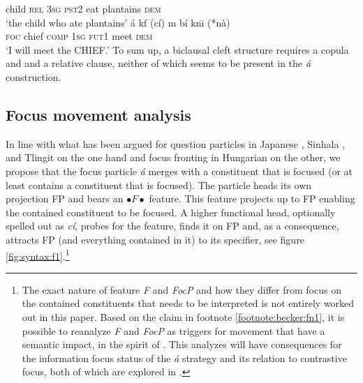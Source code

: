 \documentclass[output=paper,
modfonts
]{langscibook}
\begin{document}
     child \textsc{rel} \textsc{3sg} \textsc{pst2} eat plantains \textsc{dem} \\ 
\glt `the child who ate plantains'
\z
\ea \label{ex:becker:s6}
\gll \'{a} {kf} (c\'{i}) m b\'{i} kn\={\i} (*{n\`a}) \\  
     \textsc{foc} {chief} \textsc{comp} \textsc{1sg} \textsc{fut1} meet \textsc{dem} \\ 
\glt `I will meet the CHIEF.'
\z
To sum up, a biclausal cleft structure requires a copula and and a relative clause, neither of which seems to be present in the {\em \'a} construction.

\subsection{Focus movement analysis} \label{sec:becker:subsec:analysis}
In line with what has been argued for question particles in Japanese \citep{Hagstrom1998}, Sinhala \citep{Kishimoto2005}, and Tlingit \citep{Cable2010} on the one hand and focus fronting in Hungarian \citep{Horvath2007,Horvath2010,Horvath2013} on the other, we propose that the focus particle {\em \'a} merges with a constituent that is focused (or at least contains a constituent that is focused). The particle heads its own projection FP and bears an {\small $\bullet F \bullet$} feature. This feature projects up to FP enabling the contained constituent to be focused. A higher functional head, optionally spelled out as {\em c\'i}, probes for the feature, finds it on FP and, as a consequence, attracts FP (and everything contained in it) to its specifier, see figure \ref{fig:syntax:f1}.\footnote{The exact nature of feature {\em F} and {\em FocP} and how they differ from focus on the contained constituents that needs to be interpreted is not entirely worked out in this paper. Based on the claim in footnote \ref{footnote:becker:fn1}, it is possible to reanalyze {\em F} and {\em FocP} as triggers for movement that have a semantic impact, in the spirit of \citet{Horvath2007,Horvath2013}. This analyzes will have consequences for the information focus status of the {\em \'a} strategy and its relation to {contrastive focus}, both of which are explored in \citet{Driemeltoappear}.}
\end{document}
